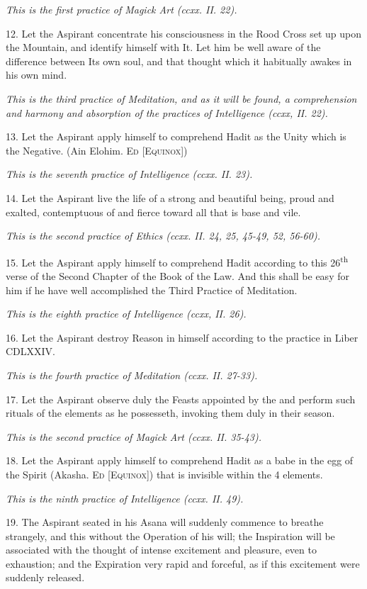\textit{This is the first practice of Magick Art (ccxx. II. 22).}

12. Let the Aspirant concentrate his consciousness in the Rood Cross set up upon the Mountain, and identify himself with It. Let him be well aware of the difference between Its own soul, and that thought which it habitually awakes in his own mind.

\textit{This is the third practice of Meditation, and as it will be found, a comprehension and harmony and absorption of the practices of Intelligence (ccxx, II. 22).}

13. Let the Aspirant apply himself to comprehend Hadit as the Unity which is the Negative. (Ain Elohim. \textsc{Ed [Equinox]})

\textit{This is the seventh practice of Intelligence (ccxx. II. 23).}

14. Let the Aspirant live the life of a strong and beautiful being, proud and exalted, contemptuous of and fierce toward all that is base and vile.

\textit{This is the second practice of Ethics (ccxx. II. 24, 25, 45-49, 52, 56-60).}

15. Let the Aspirant apply himself to comprehend Hadit according to this 26\textsuperscript{th} verse of the Second Chapter of the Book of the Law. And this shall be easy for him if he have well accomplished the Third Practice of Meditation.

\textit{This is the eighth practice of Intelligence (ccxx, II. 26).}

16. Let the Aspirant destroy Reason in himself according to the practice in Liber CDLXXIV.

\textit{This is the fourth practice of Meditation (ccxx. II. 27-33).}

17.
Let the Aspirant observe duly the Feasts appointed by the \Argentium{} and perform such rituals of the elements as he possesseth, invoking them duly in their season.

\textit{This is the second practice of Magick Art (ccxx. II. 35-43).}

18. Let the Aspirant apply himself to comprehend Hadit as a babe in the egg of the Spirit (Akasha. \textsc{Ed [Equinox]}) that is invisible within the 4 elements.

\textit{This is the ninth practice of Intelligence (ccxx. II. 49).}

19. The Aspirant seated in his Asana will suddenly commence to breathe strangely, and this without the Operation of his will; the Inspiration will be associated with the thought of intense excitement and pleasure, even to exhaustion; and the Expiration very rapid and forceful, as if this excitement were suddenly released.

